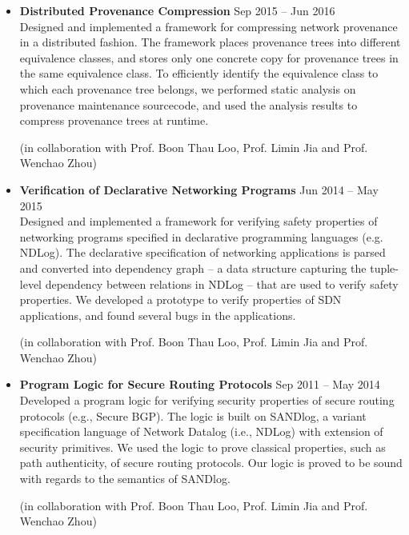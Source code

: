 \begin{itemize}
\item {\bf Distributed Provenance Compression} \hfill Sep 2015 -- Jun
  2016\\ Designed and implemented a framework for compressing network
  provenance in a distributed fashion. The framework places provenance
  trees into different equivalence classes, and stores only one
  concrete copy for provenance trees in the same equivalence class. To
  efficiently identify the equivalence class to which each provenance tree
  belongs, we performed static analysis on provenance maintenance
  sourcecode, and used the analysis results to compress provenance
  trees at runtime.


(in collaboration with Prof. Boon Thau Loo, Prof. Limin Jia and Prof. Wenchao Zhou)
\item {\bf Verification of Declarative Networking Programs} \hfill Jun
  2014 -- May 2015\\ Designed and implemented a framework for
  verifying safety properties of networking programs specified in
  declarative programming languages (e.g. NDLog). The declarative
  specification of networking applications is parsed and converted
  into dependency graph -- a data structure capturing the tuple-level
  dependency between relations in NDLog -- that are used to verify
  safety properties.
  We developed a prototype to verify
  properties of SDN applications, and found several bugs in the
  applications.


(in collaboration with Prof. Boon Thau Loo, Prof. Limin Jia and Prof. Wenchao Zhou)
\item {\bf Program Logic for Secure Routing Protocols} \hfill Sep 2011
  -- May 2014\\ Developed a program logic for verifying security
  properties of secure routing protocols (e.g., Secure BGP). The logic
  is built on SANDlog, a variant specification language of Network
  Datalog (i.e., NDLog) with extension of security primitives. We used
  the logic to prove classical properties, such as path authenticity,
  of secure routing protocols. Our logic is proved to be sound with
  regards to the semantics of SANDlog.


(in collaboration with Prof. Boon Thau Loo, Prof. Limin Jia and Prof. Wenchao Zhou)
\end{itemize}
